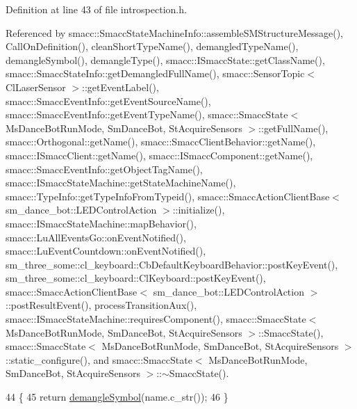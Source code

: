 Definition at line 43 of file introspection.\+h.



Referenced by smacc\+::\+Smacc\+State\+Machine\+Info\+::assemble\+S\+M\+Structure\+Message(), Call\+On\+Definition(), clean\+Short\+Type\+Name(), demangled\+Type\+Name(), demangle\+Symbol(), demangle\+Type(), smacc\+::\+I\+Smacc\+State\+::get\+Class\+Name(), smacc\+::\+Smacc\+State\+Info\+::get\+Demangled\+Full\+Name(), smacc\+::\+Sensor\+Topic$<$ Cl\+Laser\+Sensor $>$\+::get\+Event\+Label(), smacc\+::\+Smacc\+Event\+Info\+::get\+Event\+Source\+Name(), smacc\+::\+Smacc\+Event\+Info\+::get\+Event\+Type\+Name(), smacc\+::\+Smacc\+State$<$ Ms\+Dance\+Bot\+Run\+Mode, Sm\+Dance\+Bot, St\+Acquire\+Sensors $>$\+::get\+Full\+Name(), smacc\+::\+Orthogonal\+::get\+Name(), smacc\+::\+Smacc\+Client\+Behavior\+::get\+Name(), smacc\+::\+I\+Smacc\+Client\+::get\+Name(), smacc\+::\+I\+Smacc\+Component\+::get\+Name(), smacc\+::\+Smacc\+Event\+Info\+::get\+Object\+Tag\+Name(), smacc\+::\+I\+Smacc\+State\+Machine\+::get\+State\+Machine\+Name(), smacc\+::\+Type\+Info\+::get\+Type\+Info\+From\+Typeid(), smacc\+::\+Smacc\+Action\+Client\+Base$<$ sm\+\_\+dance\+\_\+bot\+::\+L\+E\+D\+Control\+Action $>$\+::initialize(), smacc\+::\+I\+Smacc\+State\+Machine\+::map\+Behavior(), smacc\+::\+Lu\+All\+Events\+Go\+::on\+Event\+Notified(), smacc\+::\+Lu\+Event\+Countdown\+::on\+Event\+Notified(), sm\+\_\+three\+\_\+some\+::cl\+\_\+keyboard\+::\+Cb\+Default\+Keyboard\+Behavior\+::post\+Key\+Event(), sm\+\_\+three\+\_\+some\+::cl\+\_\+keyboard\+::\+Cl\+Keyboard\+::post\+Key\+Event(), smacc\+::\+Smacc\+Action\+Client\+Base$<$ sm\+\_\+dance\+\_\+bot\+::\+L\+E\+D\+Control\+Action $>$\+::post\+Result\+Event(), process\+Transition\+Aux(), smacc\+::\+I\+Smacc\+State\+Machine\+::requires\+Component(), smacc\+::\+Smacc\+State$<$ Ms\+Dance\+Bot\+Run\+Mode, Sm\+Dance\+Bot, St\+Acquire\+Sensors $>$\+::\+Smacc\+State(), smacc\+::\+Smacc\+State$<$ Ms\+Dance\+Bot\+Run\+Mode, Sm\+Dance\+Bot, St\+Acquire\+Sensors $>$\+::static\+\_\+configure(), and smacc\+::\+Smacc\+State$<$ Ms\+Dance\+Bot\+Run\+Mode, Sm\+Dance\+Bot, St\+Acquire\+Sensors $>$\+::$\sim$\+Smacc\+State().


\begin{DoxyCode}
44 \{
45     \textcolor{keywordflow}{return} \hyperlink{namespacesmacc_a4dd421d5d4e7617fcf4a9a756797adda}{demangleSymbol}(name.c\_str());
46 \}
\end{DoxyCode}


